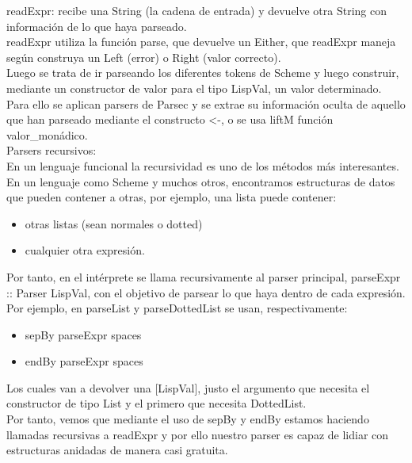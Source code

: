 readExpr: recibe una String (la cadena de entrada) y devuelve otra String con informaci\'on de lo que haya parseado.\\

readExpr utiliza la funci\'on parse, que devuelve un Either, que readExpr maneja seg\'un construya un Left (error) o Right (valor correcto).\\

Luego se trata de ir parseando los diferentes tokens de Scheme y luego construir, mediante un constructor de valor para el tipo LispVal, un valor determinado.\\

Para ello se aplican parsers de Parsec y se extrae su informaci\'on oculta de aquello que han parseado mediante el constructo <-, o se usa liftM funci\'on valor\_mon\'adico.\\

Parsers recursivos:\\

En un lenguaje funcional la recursividad es uno de los m\'etodos m\'as interesantes. En un lenguaje como Scheme y muchos otros, encontramos estructuras de datos que pueden contener a otras, por ejemplo, una lista puede contener:\\

\begin{itemize}
  \item otras listas (sean normales o dotted)
  \item cualquier otra expresi\'on.
\end{itemize}

Por tanto, en el int\'erprete se llama recursivamente al parser principal, parseExpr :: Parser LispVal, con el objetivo de parsear lo que haya dentro de cada expresi\'on.\\

Por ejemplo, en parseList y parseDottedList se usan, respectivamente:\\

\begin{itemize}
  \item sepBy parseExpr spaces
  \item endBy parseExpr spaces
\end{itemize}

Los cuales van a devolver una [LispVal], justo el argumento que necesita el constructor de tipo List y el primero que necesita DottedList.\\

Por tanto, vemos que mediante el uso de sepBy y endBy estamos haciendo llamadas recursivas a readExpr y por ello nuestro parser es capaz de lidiar con estructuras anidadas de manera casi gratuita.\\

